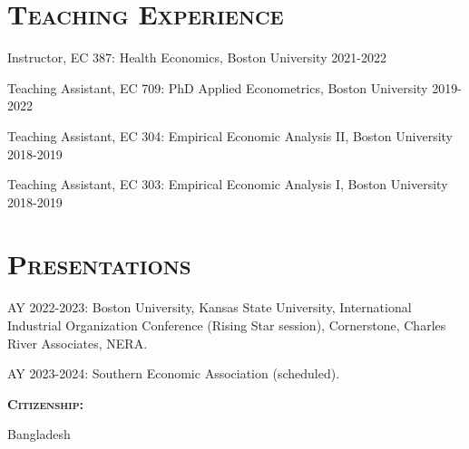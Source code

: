 \documentclass[11pt,overlapped,line,letterpaper]{res}
\newenvironment{list1}{
  \begin{list}{\ding{113}}{%
      \setlength{\itemsep}{0in} \setlength{\itemindent}{-1.6em}
      \setlength{\parsep}{0in} \setlength{\parskip}{0in}
      \setlength{\topsep}{0in} \setlength{\partopsep}{0in}
      \setlength{\leftmargin}{0.5in}}}{\end{list}}
\begin{document}
\begin{resume}
\section{\textbf{\textsc{Teaching Experience}}}
\begin{list1}
\item[] Instructor, EC 387: Health Economics, Boston University \hfill{2021-2022} 
\item[] Teaching Assistant, EC 709: PhD Applied Econometrics, Boston University \hfill{2019-2022}
\item[] Teaching Assistant, EC 304: Empirical Economic Analysis II, Boston University \hfill{2018-2019}
\item[] Teaching Assistant, EC 303: Empirical Economic Analysis I, Boston University \hfill{2018-2019}
\end{list1}

\section{\textbf{\textsc{Presentations}}}
\begin{list1}
\item[] AY 2022-2023: Boston University, Kansas State University, International Industrial Organization Conference (Rising Star session), Cornerstone, Charles River Associates, NERA.
\item[] AY 2023-2024: Southern Economic Association (scheduled).
\end{list1}




\begin{flushleft}
\textbf{\textsc{Citizenship:}}  
\begin{list1}
    \item[] Bangladesh
\end{list1}
\end{flushleft}


\end{resume}
\end{document}
